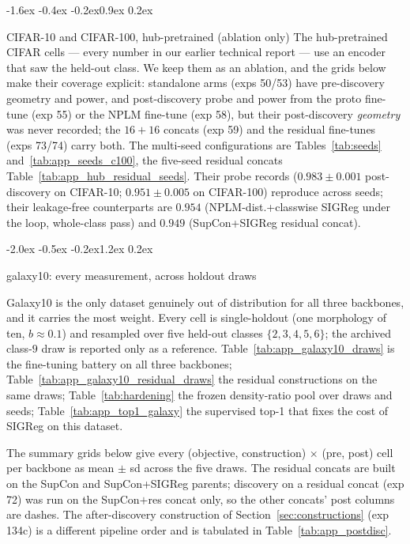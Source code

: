 \documentclass{article}
\makeatletter
\renewcommand\section{\@startsection{section}{1}{\z@}%
  {-2.0ex \@plus -0.5ex \@minus -0.2ex}{1.2ex \@plus 0.2ex}%
  {\large\bf\raggedright}}
\renewcommand\subsection{\@startsection{subsection}{2}{\z@}%
  {-1.6ex \@plus -0.4ex \@minus -0.2ex}{0.9ex \@plus 0.2ex}%
  {\normalsize\bf\raggedright}}
\makeatother
\begin{document}
\subsection{CIFAR-10 and CIFAR-100, hub-pretrained (ablation only)}
The hub-pretrained CIFAR cells --- every number in our earlier technical
report --- use an encoder that saw the held-out class. We keep them as an
ablation, and the grids below make their coverage explicit: standalone arms
(exps 50/53) have pre-discovery geometry and power, and post-discovery probe
and power from the proto fine-tune (exp 55) or the NPLM fine-tune (exp 58),
but their post-discovery \emph{geometry} was never recorded; the $16{+}16$
concats (exp 59) and the residual fine-tunes (exps 73/74) carry both. The
multi-seed configurations are Tables~\ref{tab:seeds} and~\ref{tab:app_seeds_c100},
the five-seed residual concats Table~\ref{tab:app_hub_residual_seeds}. Their
probe records ($0.983 \pm 0.001$ post-discovery on CIFAR-10; $0.951 \pm
0.005$ on CIFAR-100) reproduce across seeds; their leakage-free counterparts
are $0.954$ (NPLM-dist.+classwise SIGReg under the loop, whole-class pass)
and $0.949$
(SupCon+SIGReg residual concat).





\section{galaxy10: every measurement, across holdout draws}
\label{sec:app_galaxy}

Galaxy10 is the only dataset genuinely out of distribution for all three
backbones, and it carries the most weight. Every cell is single-holdout
(one morphology of ten, $b \approx 0.1$) and resampled over five held-out
classes $\{2, 3, 4, 5, 6\}$; the archived class-$9$ draw is reported only as a
reference. Table~\ref{tab:app_galaxy10_draws} is the fine-tuning battery on
all three backbones; Table~\ref{tab:app_galaxy10_residual_draws} the residual
constructions on the same draws; Table~\ref{tab:hardening} the frozen
density-ratio pool over draws and seeds; Table~\ref{tab:app_top1_galaxy}
the supervised top-1 that fixes the cost of SIGReg on this dataset.

The summary grids below give every (objective, construction) $\times$
(pre, post) cell per backbone as mean $\pm$ sd across the five draws. The
residual concats are built on the SupCon and SupCon+SIGReg parents; discovery
on a residual concat (exp 72) was run on the SupCon$+$res concat only, so the
other concats' post columns are dashes. The after-discovery construction of
Section~\ref{sec:constructions} (exp 134c) is a different pipeline order and
is tabulated in Table~\ref{tab:app_postdisc}.
\end{document}
